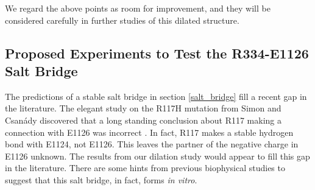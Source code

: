 We regard the above points as room for improvement, and they will be considered carefully in further studies of this dilated structure.







\subsection{Proposed Experiments to Test the R334-E1126 Salt Bridge}

The predictions of a stable salt bridge in section \ref{salt_bridge} fill a recent gap in the literature. The elegant study on the R117H mutation from Simon and Csanády \cite{simon2021} discovered that a long standing conclusion about R117 making a connection with E1126 was incorrect \cite{cui2014}. In fact, R117 makes a stable hydrogen bond with E1124, not E1126. This leaves the partner of the negative charge in E1126 unknown. The results from our dilation study would appear to fill this gap in the literature. There are some hints from previous biophysical studies to suggest that this salt bridge, in fact, forms \textit {in vitro}.

